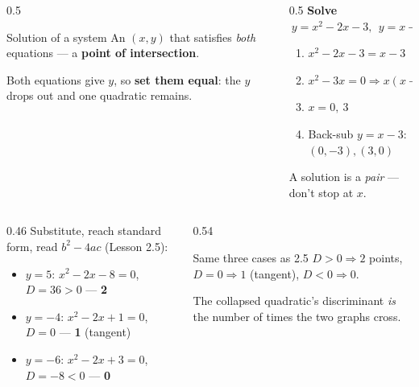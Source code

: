 \documentclass[aspectratio=169, 11pt]{beamer}
\begin{document}
\begin{frame}[t, plain]
  \begin{columns}[T]
    \begin{column}{0.5\textwidth}
      \begin{block}{Solution of a system}
        An $(x,y)$ that satisfies \emph{both} equations --- a \textbf{point of intersection}.
      \end{block}
      Both equations give $y$, so \textbf{set them equal}: the $y$ drops out and one quadratic remains.
    \end{column}
    \begin{column}{0.5\textwidth}
      \textbf{Solve} $\ y=x^2-2x-3,\ \ y=x-3$
      \begin{enumerate}\setlength{\itemsep}{1pt}
        \item $x^2-2x-3=x-3$
        \item $x^2-3x=0\Rightarrow x(x-3)=0$
        \item $x=0,\ 3$
        \item Back-sub $y=x-3$: $(0,-3),(3,0)$
      \end{enumerate}
      \small A solution is a \emph{pair} --- don't stop at $x$.
    \end{column}
  \end{columns}
\end{frame}

\begin{frame}[t, plain]
  \begin{columns}[T]
    \begin{column}{0.46\textwidth}
      Substitute, reach standard form, read $b^2-4ac$ (Lesson 2.5):
      \begin{itemize}\setlength{\itemsep}{3pt}
        \item $y=5$: $x^2-2x-8=0$, $D=36>0$ --- \textbf{2}
        \item $y=-4$: $x^2-2x+1=0$, $D=0$ --- \textbf{1} (tangent)
        \item $y=-6$: $x^2-2x+3=0$, $D=-8<0$ --- \textbf{0}
      \end{itemize}
    \end{column}
    \begin{column}{0.54\textwidth}
      \begin{block}{Same three cases as 2.5}
        $D>0\Rightarrow 2$ points, \quad $D=0\Rightarrow 1$ (tangent), \quad $D<0\Rightarrow 0$.
      \end{block}
      The collapsed quadratic's discriminant \emph{is} the number of times the two graphs cross.
    \end{column}
  \end{columns}
\end{frame}
\end{document}
